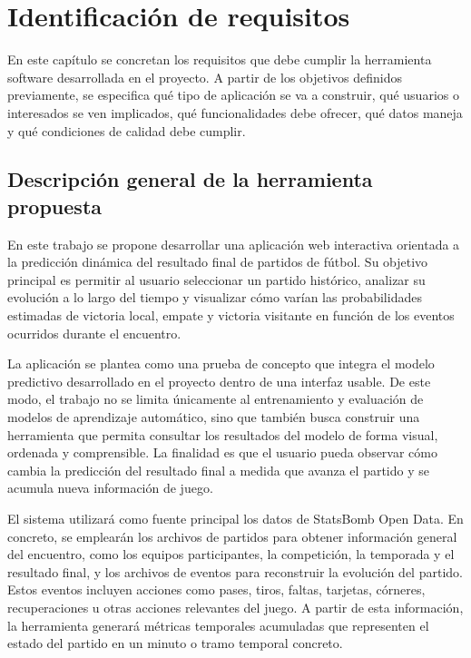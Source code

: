 \chapter{Identificación de requisitos}

En este capítulo se concretan los requisitos que debe cumplir la herramienta software desarrollada en el proyecto. A partir de los objetivos definidos previamente, se especifica qué tipo de aplicación se va a construir, qué usuarios o interesados se ven implicados, qué funcionalidades debe ofrecer, qué datos maneja y qué condiciones de calidad debe cumplir.

\section{Descripción general de la herramienta propuesta}

En este trabajo se propone desarrollar una aplicación web interactiva orientada a la predicción dinámica del resultado final de partidos de fútbol. Su objetivo principal es permitir al usuario seleccionar un partido histórico, analizar su evolución a lo largo del tiempo y visualizar cómo varían las probabilidades estimadas de victoria local, empate y victoria visitante en función de los eventos ocurridos durante el encuentro.

La aplicación se plantea como una prueba de concepto que integra el modelo predictivo desarrollado en el proyecto dentro de una interfaz usable. De este modo, el trabajo no se limita únicamente al entrenamiento y evaluación de modelos de aprendizaje automático, sino que también busca construir una herramienta que permita consultar los resultados del modelo de forma visual, ordenada y comprensible. La finalidad es que el usuario pueda observar cómo cambia la predicción del resultado final a medida que avanza el partido y se acumula nueva información de juego.

El sistema utilizará como fuente principal los datos de StatsBomb Open Data. En concreto, se emplearán los archivos de partidos para obtener información general del encuentro, como los equipos participantes, la competición, la temporada y el resultado final, y los archivos de eventos para reconstruir la evolución del partido. Estos eventos incluyen acciones como pases, tiros, faltas, tarjetas, córneres, recuperaciones u otras acciones relevantes del juego. A partir de esta información, la herramienta generará métricas temporales acumuladas que representen el estado del partido en un minuto o tramo temporal concreto.

